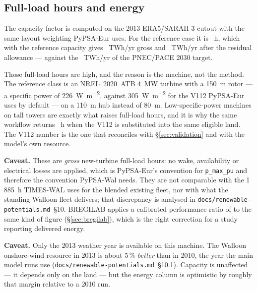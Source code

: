 \documentclass[11pt,a4paper]{article}
\newcommand{\caveat}[1]{\par\medskip\noindent\colorbox{warn!8}{%
  \begin{minipage}{\dimexpr\linewidth-2\fboxsep}\textbf{Caveat.} #1\end{minipage}}\par\medskip}
\begin{document}
\subsection{Full-load hours and energy}

The capacity factor is computed on the 2013 ERA5/SARAH-3 cutout with the same
layout weighting PyPSA-Eur uses. For the reference case it is \AdminFlh{}~h,
which with the reference capacity gives \PlaceEnergy{}~TWh/yr gross and
\ResCentralEnergy{}~TWh/yr after the residual allowance --- against the
\TargetTWh{}~TWh/yr of the PNEC/PACE 2030 target.

Those full-load hours are high, and the reason is the machine, not the method.
The reference class is an NREL~2020~ATB \SI{4}{\mega\watt} turbine with a
\SI{150}{\metre} rotor --- a specific power of
\SI{226}{\watt\per\square\metre}, against \SI{305}{\watt\per\square\metre} for
the V112 PyPSA-Eur uses by default --- on a \SI{110}{\metre} hub instead of
\SI{80}{\metre}. Low-specific-power machines on tall towers are exactly what
raises full-load hours, and it is why the same workflow returns
\VOneTwelveFlh{}~h when the V112 is substituted into the same eligible land. The
V112 number is the one that reconciles with §\ref{sec:validation} and with the
model's own resource.

\caveat{These are \emph{gross} new-turbine full-load hours: no wake, availability
or electrical losses are applied, which is PyPSA-Eur's convention for
\texttt{p\_max\_pu} and therefore the convention PyPSA-Wal needs. They are not
comparable with the 1\,885~h TIMES-WAL uses for the blended existing fleet, nor
with what the standing Walloon fleet delivers; that discrepancy is analysed in
\texttt{docs/renewable-potentials.md}~§10. BREGILAB applies a calibrated
performance ratio of \BregPerf{} to the same kind of figure
(§\ref{sec:bregilab}), which is the right correction for a study reporting
delivered energy.}

\caveat{Only the 2013 weather year is available on this machine. The Walloon
onshore-wind resource in 2013 is about 5\,\% \emph{better} than in 2010, the
year the main model runs use (\texttt{docs/renewable-potentials.md}~§10.1).
Capacity is unaffected --- it depends only on the land --- but the energy column
is optimistic by roughly that margin relative to a 2010 run.}

\begin{table}[htbp]\centering\footnotesize
\caption{Reference scenario  across turbine classes and capacity
densities. \emph{derived} is $P_{\mathrm{nom}}/(5D\times7D)$; \emph{pypsa eur}
is PyPSA-Eur's \SI{3}{\mega\watt\per\square\kilo\metre}; \emph{dense} is a
$4D\times6D$ upper bound. These are the area-times-density figures, retained for
comparison with studies reported on that convention.}
\label{tab:sensitivity}
\resizebox{\linewidth}{!}{}
\end{table}
\end{document}
